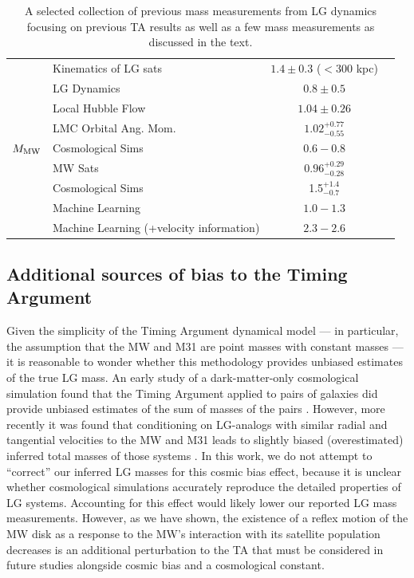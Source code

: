 \documentclass[twocolumn]{aastex631}
\newcommand{\mmw}{\ensuremath{M_{\rm MW}}}
\begin{document}
\begin{table}
\begin{tabular}{clc|c}
    \hline
    \multirow{9}{*}{\mmw}&  Kinematics of LG sats & $1.4 \pm 0.3$ ($<$300 kpc)
    & \citealt{Watkins2010}\\
    & LG Dynamics &$0.8\pm0.5$ & \citealt{Diaz2014}\\
    & Local Hubble Flow & $1.04 \pm 0.26$ & \citealt{Penarrubia2016}\\
    & LMC Orbital Ang. Mom. & $1.02^{+0.77}_{-0.55}$ & \citealt{Patel2017b}\\
    & Cosmological Sims & $0.6-0.8$ & \citealt{Carlesi2017}\\
    & MW Sats & $0.96^{+0.29}_{-0.28}$ & \citealt{Patel2018}\\
    & Cosmological Sims & 1.5$^{+1.4}_{-0.7}$ & \citealt{Zhai2020} \\
    & Machine Learning & $1.0-1.3$ & \citealt{Villanueva-Domingo2021}\\
    & Machine Learning (+velocity information) & $2.3-2.6$ &
    \citealt{Villanueva-Domingo2021}\\
  \hline\hline
  \end{tabular}
  \caption{\label{table:masses}A selected collection of previous mass
  measurements from LG dynamics focusing on previous TA results as well as a few
  mass measurements as discussed in the text.}
\end{table}


\subsection{Additional sources of bias to the Timing Argument}
Given the simplicity of the Timing Argument dynamical model --- in particular,
the assumption that the MW and M31 are point masses with constant masses --- it
is reasonable to wonder whether this methodology provides unbiased estimates of
the true LG mass.
An early study of a dark-matter-only cosmological simulation found that the
Timing Argument applied to pairs of galaxies did provide unbiased estimates of
the sum of masses of the pairs \citep{LiWhite2008}.
However, more recently it was found that conditioning on LG-analogs with similar
radial and tangential velocities to the MW and M31 leads to slightly biased
(overestimated) inferred total masses of those systems \citep{Gonzalez2014,
Hartl2021}.
In this work, we do not attempt to ``correct'' our inferred LG masses for this
cosmic bias effect, because it is unclear whether cosmological simulations
accurately reproduce the detailed properties of LG systems.
Accounting for this effect would likely lower our reported LG mass measurements.
However, as we have shown, the existence of a reflex motion of the
MW disk as a response to the MW's interaction with its satellite population
decreases is an additional perturbation to the TA that must be considered in
future studies alongside cosmic bias and a cosmological constant.
\end{document}
